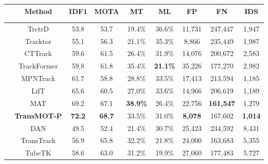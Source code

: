 \documentclass[10pt,twocolumn,letterpaper]{article}
\makeatletter
\newcommand{\thickhline}{\noalign {\ifnum 0=`}\fi \hrule height 1pt
    \futurelet \reserved@a \@xhline
}
\makeatother
\begin{document}
\begin{table}
	\footnotesize
	\begin{center}
		
		
		\begin{tabular}{@{\hskip 0.2mm}c@{\hskip 0.5mm}|@{\hskip 0.1mm}c@{\hskip 0.1mm}c@{\hskip 1.5mm}c@{\hskip 0.1mm}c@{\hskip 1.5mm}c@{\hskip 1.5mm}c@{\hskip 1.5mm}c@{\hskip 1.5mm}c@{\hskip 1.5mm}}
			\hline\thickhline
			 & Method & IDF1 & MOTA & MT & ML & FP & FN & IDS\\
			\hline
			\multirow{7}{*}{\rotatebox{90}{Public Detection}}
			
			&TrctrD\cite{xu2020train} & 53.8 & 53.7 & 19.4\% & 36.6\% & 11,731 & 247,447 & 1,947 \\
			
			&Tracktor\cite{bergmann2019tracking} & 55.1 & 56.3 & 21.1\% & 35.3\% & 8,866 & 235,449 & 1,987 \\
			
			
			&CTTrack \cite{zhou2020tracking}& 59.6 & 61.5 & 26.4\%& 31.9\%& 14,076 & 200,672 & 2,583\\
			
			&TrackFormer\cite{meinhardt2021trackformer} & 59.8 & 61.8 & 35.4\% & \textbf{21.1\%} & 35,226 & 177,270 & 2,982 \\
			
			&MPNTrack\cite{braso2020learning} & 61.7 & 58.8 & 28.8\% & 33.5\% & 17,413 & 213,594 & 1,185 \\
			
			&LifT \cite{hornakova2020lifted}& 65.6& 60.5& 27.0\%& 33.6\%& 14,966 & 206,619 & 1,189\\
			
			&MAT \cite{han2020mat}& 69.2& 67.1& \textbf{38.9\%} & 26.4\%& 22,756 & \textbf{161,547} & 1,279\\
			
			\cline{2-9}
			&\textbf{TransMOT-P} &\textbf{72.2}&\textbf{68.7}&33.5\% &31.0\% & \textbf{8,078} & 167,602 & \textbf{1,014}\\
			\hline\hline
			\multirow{7}{*}{\rotatebox{90}{Private Detection}}
			&DAN\cite{sun2019deep} & 49.5 & 52.4 & 21.4\% &30.7\% &25,423 &234,592 &8,431 \\
			
			&TransTrack\cite{sun2020transtrack} & 56.9 & 65.8 & 32.2\% &21.8\% &24,000 &163,683 &5,355 \\
			
			&TubeTK \cite{Pang_2020_CVPR}& 58.6& 63.0& 31.2\%& 19.9\%& 27,060 &177,483 &5,727\\
			

\end{tabular}
\end{center}
\end{table}
\end{document}
